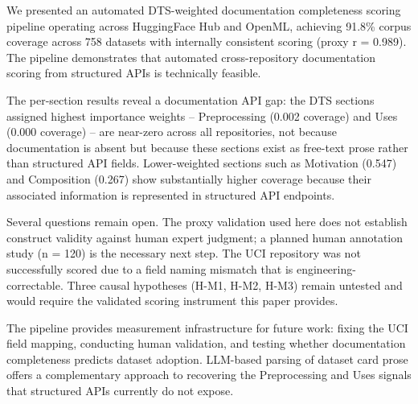 
We presented an automated DTS-weighted documentation completeness scoring pipeline operating across HuggingFace Hub and OpenML, achieving 91.8\% corpus coverage across 758 datasets with internally consistent scoring (proxy r = 0.989). The pipeline demonstrates that automated cross-repository documentation scoring from structured APIs is technically feasible.

The per-section results reveal a documentation API gap: the DTS sections assigned highest importance weights -- Preprocessing (0.002 coverage) and Uses (0.000 coverage) -- are near-zero across all repositories, not because documentation is absent but because these sections exist as free-text prose rather than structured API fields. Lower-weighted sections such as Motivation (0.547) and Composition (0.267) show substantially higher coverage because their associated information is represented in structured API endpoints.

Several questions remain open. The proxy validation used here does not establish construct validity against human expert judgment; a planned human annotation study (n = 120) is the necessary next step. The UCI repository was not successfully scored due to a field naming mismatch that is engineering-correctable. Three causal hypotheses (H-M1, H-M2, H-M3) remain untested and would require the validated scoring instrument this paper provides.

The pipeline provides measurement infrastructure for future work: fixing the UCI field mapping, conducting human validation, and testing whether documentation completeness predicts dataset adoption. LLM-based parsing of dataset card prose offers a complementary approach to recovering the Preprocessing and Uses signals that structured APIs currently do not expose.
